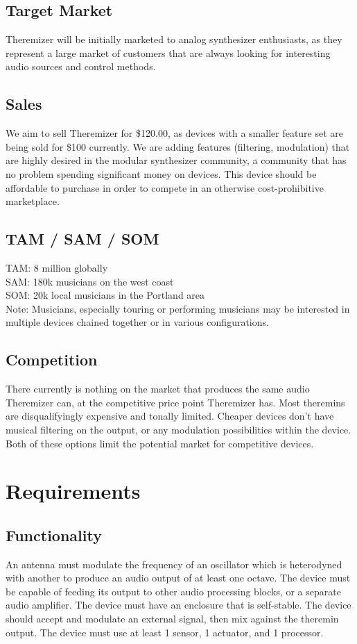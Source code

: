 \documentclass[a4paper,12pt]{article}
\begin{document}
	\subsection*{Target Market}
	Theremizer will be initially marketed to analog synthesizer enthusiasts, as they represent a large market of customers that are always looking for interesting audio sources and control methods. 

	\subsection*{Sales}
	We aim to sell Theremizer for \$120.00, as devices with a smaller feature set are being sold for \$100 currently. We are adding features (filtering, modulation) that are highly desired in the modular synthesizer community, a community that has no problem spending significant money on devices. This device should be affordable to purchase in order to compete in an otherwise cost-prohibitive marketplace.
	\subsection*{TAM / SAM / SOM}
	TAM: 8 million globally \\
	SAM: 180k musicians on the west coast \\ 
	SOM: 20k local musicians in the Portland area \\
	
	Note: Musicians, especially touring or performing musicians may be interested in multiple devices chained together or in various configurations.
	\subsection*{Competition}
	There currently is nothing on the market that produces the same audio Theremizer can, at the competitive price point Theremizer has. Most theremins are disqualifyingly expensive and tonally limited. Cheaper devices don't have musical filtering on the output, or any modulation possibilities within the device. Both of these options limit the potential market for competitive devices. 
	
	\section*{Requirements}
	\subsection*{Functionality}
	An antenna must modulate the frequency of an oscillator which is heterodyned with another to produce an audio output of at least one octave. The device must be capable of feeding its output to other audio processing blocks, or a separate audio amplifier. The device must have an enclosure that is self-stable. The device should accept and modulate an external signal, then mix against the theremin output. The device must use at least 1 sensor, 1 actuator, and 1 processor. 
\end{document}

